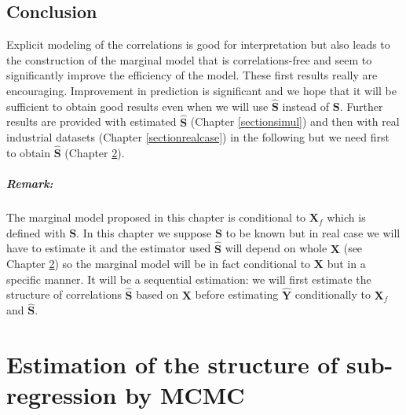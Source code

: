\documentclass[12pt,a4paper]{report}
\begin{document}


				
		\section{Conclusion} Explicit modeling of the correlations is good for interpretation but also leads to the construction of the marginal model that is correlations-free and seem to significantly improve the efficiency of the model. These first results really are encouraging. Improvement in prediction is significant and we hope that it will be sufficient to obtain good results even when we will use $\hat{\boldsymbol{S}}$ instead of $\boldsymbol{S}$. Further results are provided  with estimated $\hat{\boldsymbol{S}}$ (Chapter \ref{sectionsimul}) and then with real industrial datasets (Chapter \ref{sectionrealcase}) in the following but we need first to obtain $\hat{\boldsymbol{S}}$ (Chapter  \ref{chapterMCMC}).

\paragraph{Remark:} The marginal model proposed in this chapter is conditional to $\boldsymbol{X}_f$ which is defined with $\boldsymbol{S}$. In this chapter we suppose $\boldsymbol{S}$ to be known but in real case we will have to estimate it and the estimator used $\hat{\boldsymbol{S}}$ will depend on whole $\boldsymbol{X}$ (see Chapter \ref{chapterMCMC}) so the marginal model will be in fact conditional to $\boldsymbol{X}$ but in a specific manner. It will be a sequential estimation: we will first estimate the structure of correlations $\hat{\boldsymbol{S}}$ based on $\boldsymbol{X}$ before estimating $\hat{\boldsymbol{Y}}$ conditionally to $\boldsymbol{X}_f$ and $\hat{\boldsymbol{S}}$.		


\chapter{Estimation of the structure of sub-regression by MCMC}\label{chapterMCMC}
\end{document}
